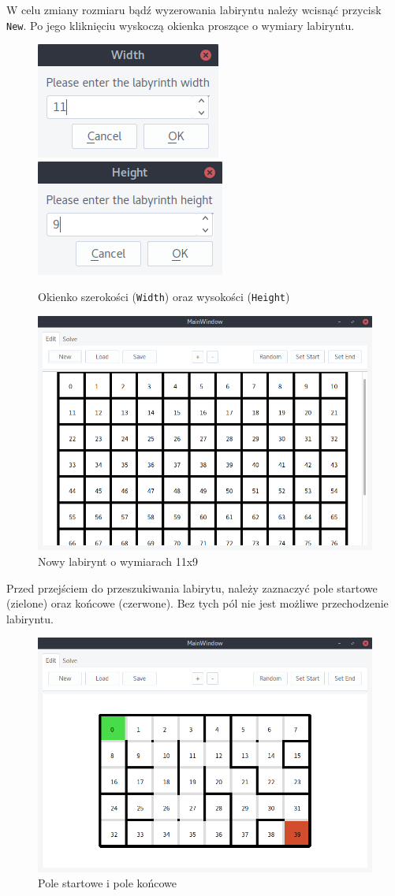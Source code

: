 \documentclass[12pt,a4paper]{article}
\begin{document}
	W celu zmiany rozmiaru bądź wyzerowania labiryntu należy wcisnąć
	przycisk \texttt{New}. Po jego kliknięciu wyskoczą okienka proszące
	o wymiary labiryntu.
	\begin{figure}[H]
		\centering
		\includegraphics[width=0.39\linewidth]{obrazki/14.png}
		\includegraphics[width=0.40\linewidth]{obrazki/15.png}
		\caption{Okienko szerokości (\texttt{Width}) oraz wysokości
		(\texttt{Height})}
	\end{figure}
	
	\begin{figure}[H]
		\centering
		\includegraphics[width=0.8\linewidth]{obrazki/16.png}
		\caption{Nowy labirynt o wymiarach 11x9}
	\end{figure}
	
	Przed przejściem do przeszukiwania labirytu, należy zaznaczyć
	pole startowe (zielone) oraz końcowe (czerwone). Bez tych pól
	nie jest możliwe przechodzenie labiryntu.
	\begin{figure}[H]
		\centering
		\includegraphics[width=0.8\linewidth]{obrazki/4.png}
		\caption{Pole startowe i pole końcowe}
	\end{figure}
	
\end{document}
